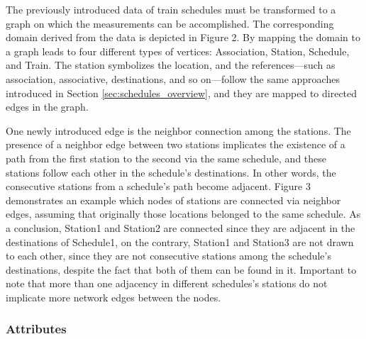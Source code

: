 The previously introduced data of train schedules must be transformed to a graph on which the measurements can be accomplished. The corresponding domain derived from the data is depicted in Figure 2. %
By mapping the domain to a graph leads to four different types of vertices: \textsf{Association}, \textsf{Station}, \textsf{Schedule}, and \textsf{Train}. The station symbolizes the location, and the references---such as \textsf{association}, \textsf{associative}, \textsf{destinations}, and so on---follow the same approaches introduced in Section \ref{sec:schedules_overview}, and they are mapped to directed edges in the graph. 

One newly introduced edge is the \textsf{neighbor} connection among the stations. The presence of a \textsf{neighbor} edge between two stations implicates the existence of a path from the first station to the second via the same schedule, and these stations follow each other in the schedule's destinations. In other words, the consecutive stations from a schedule's path become adjacent. Figure 3 demonstrates an example which nodes of stations are connected via \textsf{neighbor} edges, assuming that originally those locations belonged to the same schedule. As a conclusion, \textsf{Station1} and \textsf{Station2} are connected since they are adjacent in the destinations of \textsf{Schedule1}, on the contrary, \textsf{Station1} and \textsf{Station3} are not drawn to each other, since they are not consecutive stations among the schedule's destinations, despite the fact that both of them can be found in it. %
Important to note that more than one adjacency in different schedules's stations do not implicate more \textsf{network} edges between the nodes.

\subsubsection{Attributes}

